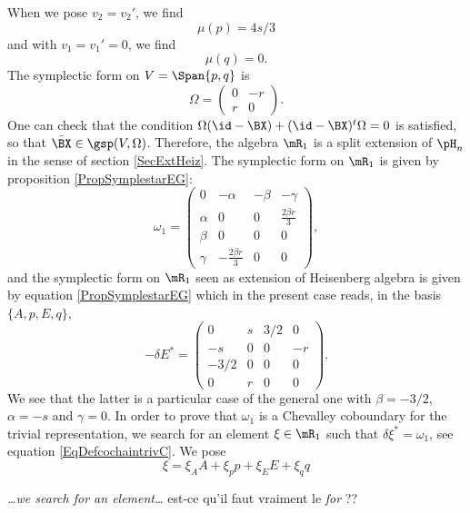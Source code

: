 When we pose $v_2=v_2'$, we find
\begin{equation}
\mu(p)=4s/3
\end{equation}
and with $v_1=v_1'=0$, we find
\begin{equation}
\mu(q)=0.
\end{equation}
The symplectic form on $V=\Span\{ p,q \}$ is 
\begin{equation}
 \Omega=\begin{pmatrix}
0&-r\\
r&0
\end{pmatrix}.
\end{equation}
One can check that the condition $\Omega(\id-\BX)+(\id-\BX)^{t}\Omega=0$ is satisfied, so that $\bar{\BX}\in\gsp(V,\Omega)$. Therefore, the algebra $\mR_{1}$ is a split extension of $\pH_{n}$ in the sense of section \ref{SecExtHeiz}. The symplectic form on $\mR_1$ is given by proposition \eqref{PropSymplestarEG}:
 \begin{equation}
\omega_{1}=\begin{pmatrix}
0	&-\alpha		&-\beta	&-\gamma\\
\alpha	&0			&0	&\frac{ 2\beta r }{ 3 }\\
\beta	&0			&0	&0\\
\gamma	&-\frac{ 2\beta r }{ 3 }	&0	&0
\end{pmatrix},
\end{equation}
and the symplectic form on $\mR_1$ seen as extension of Heisenberg algebra is given by equation \eqref{PropSymplestarEG} which in the present case reads, in the basis $\{ A,p,E,q \}$,
\begin{equation}
-\delta E^*=
\begin{pmatrix}
0&s&3/2&0\\
-s&0&0&-r\\
-3/2&0&0&0\\
0&r&0&0
\end{pmatrix}.
\end{equation}
We see that the latter is a particular case of the general one with $\beta=-3/2$, $\alpha=-s$ and $\gamma=0$. In order to prove that $\omega_{1}$ is a Chevalley coboundary for the trivial representation, we search for an element $\xi\in\mR_1$ such that $\delta\xi^*=\omega_{1}$, see equation \eqref{EqDefcochaintrivC}. We pose
\[ 
  \xi=\xi_{A}A+\xi_{p}p+\xi_{E}E+\xi_{q}q
\]

\begin{probleme}
\emph{\ldots we search for an element\ldots} est-ce qu'il faut vraiment le \emph{for} ??
\end{probleme}

